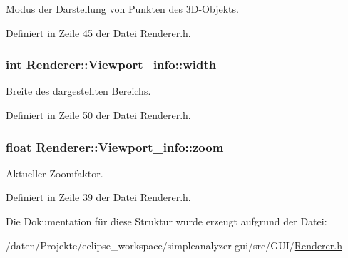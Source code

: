 Modus der Darstellung von Punkten des 3\-D-\/\-Objekts. 



Definiert in Zeile 45 der Datei Renderer.\-h.

\hypertarget{structRenderer_1_1Viewport__info_af0617337cfe95f9d5a21420335474bea}{
\subsubsection[{width}]{\setlength{\rightskip}{0pt plus 5cm}int Renderer\-::\-Viewport\-\_\-info\-::width}}\label{structRenderer_1_1Viewport__info_af0617337cfe95f9d5a21420335474bea}


Breite des dargestellten Bereichs. 



Definiert in Zeile 50 der Datei Renderer.\-h.

\hypertarget{structRenderer_1_1Viewport__info_a9bbc5e50fed7334fb237e620e6080e5e}{
\subsubsection[{zoom}]{\setlength{\rightskip}{0pt plus 5cm}float Renderer\-::\-Viewport\-\_\-info\-::zoom}}\label{structRenderer_1_1Viewport__info_a9bbc5e50fed7334fb237e620e6080e5e}


Aktueller Zoomfaktor. 



Definiert in Zeile 39 der Datei Renderer.\-h.



Die Dokumentation für diese Struktur wurde erzeugt aufgrund der Datei\-:\begin{DoxyCompactItemize}
\item 
/daten/\-Projekte/eclipse\-\_\-workspace/simpleanalyzer-\/gui/src/\-G\-U\-I/\hyperlink{Renderer_8h}{Renderer.\-h}\end{DoxyCompactItemize}
